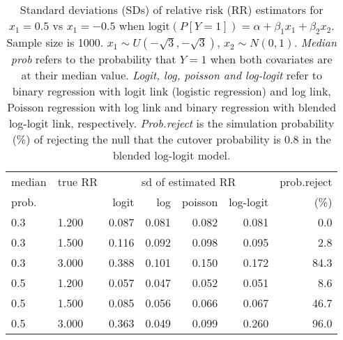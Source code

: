\documentclass[12pt,a4paper]{article}
\begin{document}
\begin{table}[H] 
\small\sf\centering 
\caption{Standard deviations (SDs) of relative risk (RR) estimators for $x_1=0.5$ vs $x_1=-0.5$ when $\mbox{logit}(P[Y=1])=\alpha+\beta_1 x_1 + \beta_2 x_2$. Sample size is 1000. $x_1 \sim $$U(-\sqrt{3},-\sqrt{3})$, $x_2 \sim N(0,1)$. {\it Median prob} refers to the probability that $Y=1$ when both covariates are at their median value. {\it Logit, log, poisson and log-logit} refer to binary regression with logit link (logistic regression) and log link, Poisson regression with log link and binary regression with blended log-logit link, respectively. {\it Prob.reject} is the simulation probability (\%) of rejecting the null that the cutover probability is $0.8$ in the blended log-logit model.} 
\begin{tabular}{llrrrrr} 
\toprule 
median & true RR & \multicolumn{4}{c}{sd of estimated RR} & prob.reject \\ 
prob. & & logit & log & poisson & log-logit  & (\%) \\ \midrule 
0.3 & 1.200 & 0.087 & 0.081 & 0.082 & 0.081 &  0.0 \\  
0.3 & 1.500 & 0.116 & 0.092 & 0.098 & 0.095 &  2.8 \\  
0.3 & 3.000 & 0.388 & 0.101 & 0.150 & 0.172 & 84.3 \\  
0.5 & 1.200 & 0.057 & 0.047 & 0.052 & 0.051 &  8.6 \\  
0.5 & 1.500 & 0.085 & 0.056 & 0.066 & 0.067 & 46.7 \\  
0.5 & 3.000 & 0.363 & 0.049 & 0.099 & 0.260 & 96.0 \\  
\bottomrule 
\end{tabular} 
\end{table} 
\end{document}
